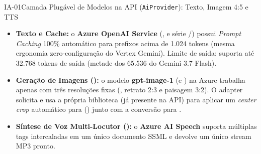 \begin{pecaarq}{IA-01}{Camada Plugável de Modelos na API (\texttt{AiProvider}): Texto, Imagem 4:5 e TTS}{\sgcp~\nativo\enspace\saws~\adaptacao\enspace\sazure~\equivalente}
\begin{campos}
  \begin{itemize}
    \item \textbf{Texto e Cache:} o \textbf{Azure OpenAI Service} (,  e série /) possui \emph{Prompt Caching} 100\% automático para prefixos acima de 1.024 tokens (mesma ergonomia zero-configuração do Vertex Gemini). Limite de saída:  suporta até 32.768 tokens de saída (metade dos 65.536 do Gemini 3.7 Flash).
    \item \textbf{Geração de Imagens ():} o modelo \textbf{gpt-image-1} (e ) na Azure trabalha apenas com três resoluções fixas (,  retrato 2:3 e  paisagem 3:2). O adapter  solicita  e usa a própria biblioteca  (já presente na API) para aplicar um \emph{center crop} automático para  () junto com a conversão para .
    \item \textbf{Síntese de Voz Multi-Locutor (\nativo):} o \textbf{Azure AI Speech} suporta múltiplas tags  intercaladas em um único documento SSML e devolve um único stream MP3 pronto.
  \end{itemize}
\end{campos}
\end{pecaarq}

